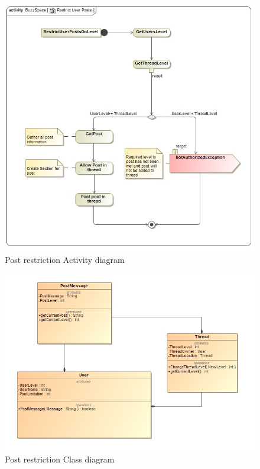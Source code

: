 \documentclass[11pt]{article}
\begin{document}
\begin{enumerate}
\begin{itemize}
			 	  				 	  			\begin{figure}[H]	
			 	  				 	  				\includegraphics[scale=0.5]{B1Activity.png}
			 	  									\caption{Post restriction Activity diagram}
			 	  				 	  			\end{figure}
			\begin{figure}[H]	
			 	  				 	  						 	  				 	  				\includegraphics[scale=0.5]{B1ClassDiagram.png}
			 	  				 	  						 	  									\caption{Post restriction Class diagram}
			 	  				 	  						 	  				 	  			\end{figure}
			 	  		

\end{itemize}
\end{enumerate}
\end{document}
